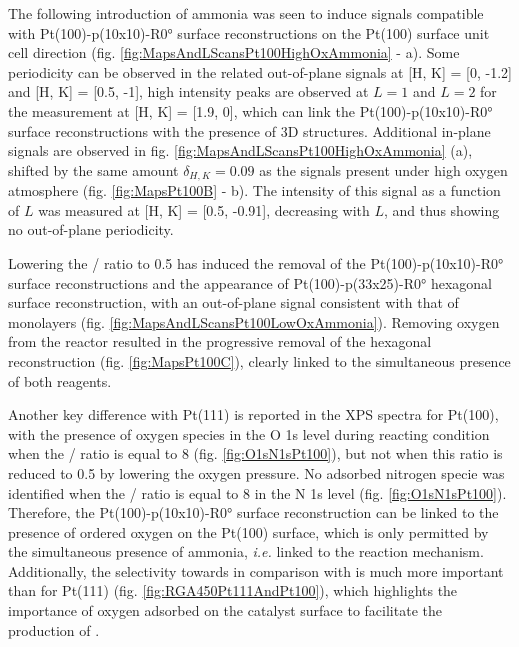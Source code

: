 The following introduction of ammonia was seen to induce signals compatible with Pt(100)-p(10x10)-R\ang{0} surface reconstructions on the Pt(100) surface unit cell direction (fig. \ref{fig:MapsAndLScansPt100HighOxAmmonia} - a).
Some periodicity can be observed in the related out-of-plane signals at [H, K] = [0, -1.2] and [H, K] = [0.5, -1], high intensity peaks are observed at $L=1$ and $L=2$ for the measurement at [H, K] = [1.9, 0], which can link the Pt(100)-p(10x10)-R\ang{0} surface reconstructions with the presence of 3D structures.
Additional in-plane signals are observed in fig. \ref{fig:MapsAndLScansPt100HighOxAmmonia} (a), shifted by the same amount $\delta_{H, K}=0.09$ as the signals present under high oxygen atmosphere (fig. \ref{fig:MapsPt100B} - b).
The intensity of this signal as a function of $L$ was measured at [H, K] = [0.5, -0.91], decreasing with $L$, and thus showing no out-of-plane periodicity.

Lowering the / ratio to \num{0.5} has induced the removal of the Pt(100)-p(10x10)-R\ang{0} surface reconstructions and the appearance of Pt(100)-p(33x25)-R\ang{0} hexagonal surface reconstruction, with an out-of-plane signal consistent with that of monolayers (fig. \ref{fig:MapsAndLScansPt100LowOxAmmonia}).
Removing oxygen from the reactor resulted in the progressive removal of the hexagonal reconstruction (fig. \ref{fig:MapsPt100C}), clearly linked to the simultaneous presence of both reagents.

Another key difference with Pt(111) is reported in the XPS spectra for Pt(100), with the presence of oxygen species in the O 1s level during reacting condition when the / ratio is equal to \num{8} (fig. \ref{fig:O1sN1sPt100}), but not when this ratio is reduced to \num{0.5} by lowering the oxygen pressure.
No adsorbed nitrogen specie was identified when the / ratio is equal to \num{8} in the N 1s level  (fig. \ref{fig:O1sN1sPt100}).
Therefore, the Pt(100)-p(10x10)-R\ang{0} surface reconstruction can be linked to the presence of ordered oxygen on the Pt(100) surface, which is only permitted by the simultaneous presence of ammonia, \textit{i.e.} linked to the reaction mechanism.
Additionally, the selectivity towards  in comparison with  is much more important than for Pt(111) (fig. \ref{fig:RGA450Pt111AndPt100}), which highlights the importance of oxygen adsorbed on the catalyst surface to facilitate the production of .

